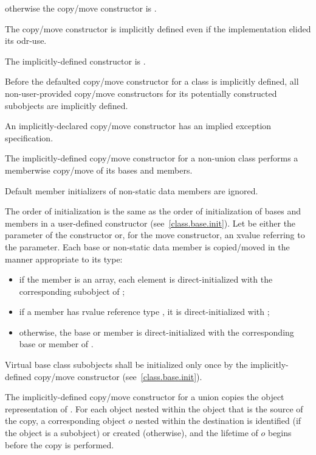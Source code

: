 %
otherwise the copy/move constructor is
.

\pnum
\begin{note}
The copy/move constructor is implicitly defined even if the implementation elided
its odr-use.
\end{note}
The implicitly-defined
constructor is .

\pnum
Before the defaulted copy/move constructor for a class is
implicitly defined,
all non-user-provided copy/move constructors for its
potentially constructed subobjects
are implicitly defined.
\begin{note}
An implicitly-declared copy/move constructor has an
implied exception specification.
\end{note}

\pnum
The implicitly-defined copy/move constructor for a non-union class
performs a memberwise copy/move of its bases and members.
\begin{note}
Default member initializers of non-static data members are ignored.
\end{note}
The order of initialization is the same as the order of initialization of bases
and members in a user-defined constructor (see~\ref{class.base.init}).
Let  be either the parameter of the constructor or, for the move constructor, an
xvalue referring to the parameter.
Each base or non-static data member
is copied/moved in the manner appropriate to its type:
\begin{itemize}
\item
if the member is an array, each element is
direct-initialized with the corresponding subobject of ;

\item
if a member  has rvalue reference type , it is direct-initialized with
;

\item
otherwise, the base or member is direct-initialized with the corresponding base or member of .
\end{itemize}

%
Virtual base class subobjects shall be initialized only once by
the implicitly-defined copy/move constructor (see~\ref{class.base.init}).

\pnum
The implicitly-defined copy/move constructor for a union
 copies the object representation of .
For each object nested within
the object that is the source of the copy,
a corresponding object $o$ nested within the destination
is identified (if the object is a subobject) or created (otherwise),
and the lifetime of $o$ begins before the copy is performed.

